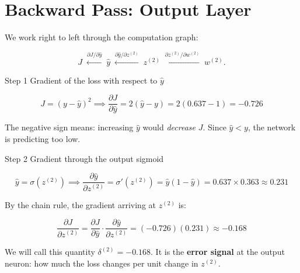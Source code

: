 \documentclass[12pt, a4paper]{article}
\newif\ifstudentmode
\newcommand{\sol}[2][6cm]{%
  \ifstudentmode
    \underline{\hspace{#1}}%
  \else
    {#2}%
  \fi
}
\theoremstyle{definition}
\newcommand{\yhat}{\hat{y}}
\newcommand{\sigmoid}{\sigma}
\newcommand{\pd}[2]{\dfrac{\partial #1}{\partial #2}}
\begin{document}
\section{Backward Pass: Output Layer}

We work right to left through the computation graph:

\[
  J \;\xleftarrow{\partial J/\partial \yhat}\;
  \yhat \;\xleftarrow{\partial \yhat/\partial z^{(2)}}\;
  z^{(2)} \;\xleftarrow{\partial z^{(2)}/\partial w^{(2)}}\;
  w^{(2)}.
\]

\begin{stepbox}{Step 1 \quad Gradient of the loss with respect to $\yhat$}

\[
  J = (y - \yhat)^2
  \implies
  \pd{J}{\yhat}
  = 2(\yhat - y)
  = 2(0.637 - 1)
  = \sol[3cm]{-0.726}
\]

The negative sign means: increasing $\yhat$ would \emph{decrease} $J$.
Since $\yhat < y$, the network is predicting too low.
\end{stepbox}

\vspace{0.8em}

\begin{stepbox}{Step 2 \quad Gradient through the output sigmoid}

\[
  \yhat = \sigmoid(z^{(2)})
  \implies
  \pd{\yhat}{z^{(2)}}
  = \sigmoid'(z^{(2)})
  = \yhat(1-\yhat)
  = 0.637 \times 0.363
  \approx \sol[3cm]{0.231}
\]

By the chain rule, the gradient arriving at $z^{(2)}$ is:

\[
  \pd{J}{z^{(2)}}
  = \pd{J}{\yhat} \cdot \pd{\yhat}{z^{(2)}}
  = (-0.726)(0.231)
  \approx \sol[3cm]{-0.168}
\]

We will call this quantity $\delta^{(2)} = -0.168$.
It is the \textbf{error signal} at the output neuron: how much the loss
changes per unit change in $z^{(2)}$.
\end{stepbox}

\vspace{0.8em}
\end{document}
